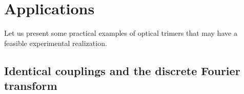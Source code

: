 \documentclass[9pt,twocolumn,twoside]{osajnl}
\begin{document}

\section{Applications}

Let us present some practical examples of optical trimers that may have a feasible experimental realization.


\subsection{Identical couplings and the discrete Fourier transform}
\end{document}
